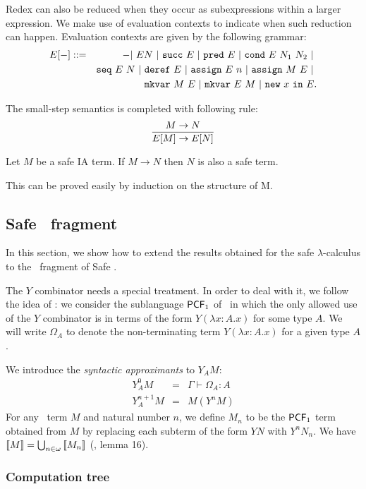Redex can also be reduced when they occur as subexpressions within a
larger expression. We make use of evaluation contexts to indicate
when such reduction can happen. Evaluation contexts are given by the
following grammar:
\begin{eqnarray*}
E[-] &::=& - |\ E N\ |\ \pcfsucc\ E\ |\ \pcfpred\ E\ |\ \pcfcond\ E\ N_1\ N_2\ |\ \\
&&    \iaseq\ E\ N\ |\ \iaderef\ E\ |\ \iaassign\ E\ n\ |\ \iaassign\ M\ E \ |\ \\
&&    \iamkvar\ M\ E\ |\ \iamkvar\ E\ M\ |\ \ianewin{x}\ E  .
\end{eqnarray*}

The small-step semantics is completed with following rule:
$$ \frac{\displaystyle M \rightarrow N}{E[M] \rightarrow E[N]} $$

\begin{lem}
\label{lem:ia_safety_preserved} Let $M$ be a safe IA term. If
$M \rightarrow N$ then $N$ is also a safe term.
\end{lem}
This can be proved easily by induction on the structure of M.


\subsection{Safe \pcf\ fragment}
In this section, we show how to extend the results obtained for the
safe $\lambda$-calculus to the \pcf\ fragment of Safe \ialgol.

The $Y$ combinator needs a special treatment. In order to deal with
it, we follow the idea of \cite{abramsky:game-semantics-tutorial}:
we consider the sublanguage $\textsf{PCF}_1$ of \pcf\ in which the only
allowed use of the $Y$ combinator is in terms of the form $Y(
\lambda x:A .x )$ for some type $A$. We will write $\Omega_A$ to
denote the non-terminating term $Y(\lambda x:A .x)$ for a given type
$A$.

We introduce the \emph{syntactic approximants} to $Y_A M$:
\begin{eqnarray*}
Y^0_A M &=& \Gamma \vdash \Omega_A : A\\
Y^{n+1}_A M &=& M( Y^n M )
\end{eqnarray*}
For any \pcf\ term $M$ and natural number $n$, we define $M_n$ to be
the $\textsf{PCF}_1$ term obtained from $M$ by replacing each subterm of the
form $Y N$ with $Y^n N_n$. We have ${[\![ M ]\!]} = \bigcup_{n\in\omega}
{[\![ M_n ]\!]}$ (\cite{abramsky:game-semantics-tutorial}, lemma 16).


\subsubsection{Computation tree}

